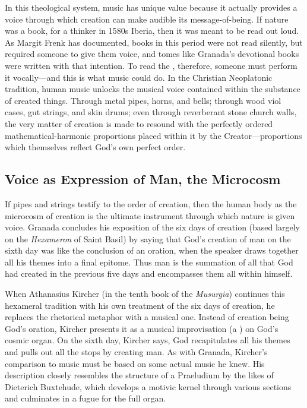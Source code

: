 In this theological system, music has unique value because it actually provides
a voice through which creation can make audible its message-of-being.
If nature was a book, for a thinker in 1580s Iberia, then it was meant to be
read out loud.
As Margit Frenk has documented, books in this period were not read silently,
but required someone to give them voice, and tomes like Granada's devotional
books were written with that intention.%
    \Autocite{Frenk:Voz}
To read the , therefore, someone must perform it
vocally---and this is what music could do.
In the Christian Neoplatonic tradition, human music unlocks the musical voice
contained within the substance of created things.
Through metal pipes, horns, and bells; through wood viol cases, gut strings,
and skin drums; even through reverberant stone church walls, the very matter of
creation is made to resound with the perfectly ordered mathematical-harmonic
proportions placed within it by the Creator---proportions which themselves
reflect God's own perfect order.


\subsection{Voice as Expression of Man, the Microcosm}

If pipes and strings testify to the order of creation, then the human body as
the microcosm of creation is the ultimate instrument through which nature is
given voice.
Granada concludes his exposition of the six days of creation (based largely
on the \emph{Hexameron} of Saint Basil) by saying that God's creation of man on
the sixth day was like the conclusion of an oration, when the speaker draws
together all his themes into a final epitome.
Thus man is the summation of all that God had created in the previous five days
and encompasses them all within himself.%
    \Autocite[243]{LuisdeGranada:Simbolo}


When Athanasius Kircher (in the tenth book of the \emph{Musurgia}) continues
this hexameral tradition with his own treatment of the six days of creation, he
replaces the rhetorical metaphor with a musical one.
Instead of creation being God's oration, Kircher presents it as a musical
improvisation (a ) on God's cosmic organ.%
    \Autocite[, 366--367]{Kircher:Musurgia}
On the sixth day, Kircher says, God recapitulates all his themes and pulls out
all the stops by creating man.
As with Granada, Kircher's comparison to music must be based on some actual
music he knew. 
His description closely resembles the structure of a Praeludium by the
likes of Dieterich Buxtehude, which develops a motivic kernel through various
sections and culminates in a fugue for the full organ.

